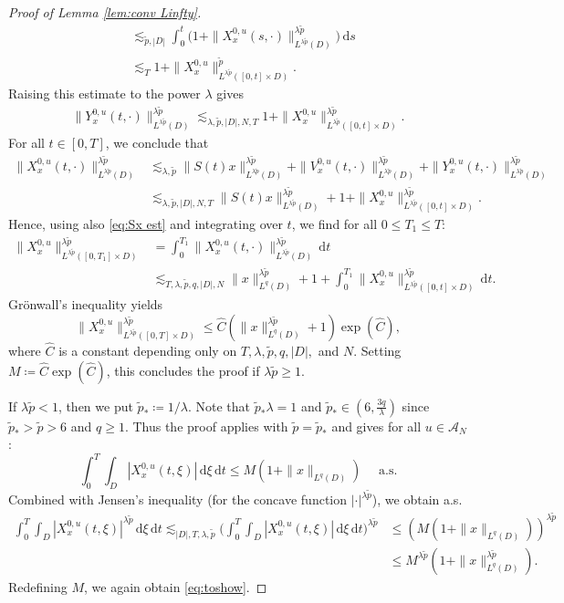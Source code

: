 \documentclass[10pt,a4paper]{amsart}
\numberwithin{equation}{section}
\newcommand{\ceqq}{\coloneqq}
\newcommand{\A}{{\mathcal A}}
\newcommand{\dd}{\,\mathrm{d}}
\begin{document}
\begin{proof}[Proof of Lemma \ref{lem:conv Linfty}]
\begin{align*}
  &\lesssim_{\tilde p,|D|} \int_0^t \big(1+\|X_x^{0,u}(s,\cdot)\|_{L^{\lambda \tilde p}(D)}^{\lambda \tilde p}\big)\dd s\\ 
  &\lesssim_T 1 + \|X_x^{0,u}\|_{L^{\lambda \tilde p}([0,t]\times D)}^{\tilde p}.
\end{align*}
Raising this estimate to the power $\lambda$ gives
\begin{align*}
  \|Y_x^{0,u}(t,\cdot)\|_{L^{\lambda\tilde p}(D)}^{\lambda\tilde p} \lesssim_{\lambda,\tilde p,|D|, N,T}   1 + \|X_x^{0,u}\|_{L^{\lambda\tilde p}([0,t]\times D)}^{\lambda\tilde p}.
\end{align*}
For all $t\in[0,T]$, we conclude that 
\begin{align*}
 \|X_x^{0,u}(t,\cdot)\|_{L^{\lambda \tilde p}(D)}^{\lambda \tilde p}
 &\lesssim_{\lambda, \tilde p} \|S(t)x\|_{L^{\lambda \tilde p}(D)}^{\lambda \tilde p}+\|V_x^{0,u}(t,\cdot)\|_{L^{\lambda \tilde p}(D)}^{\lambda \tilde p}+\|Y_x^{0,u}(t,\cdot)\|_{L^{\lambda \tilde p}(D)}^{\lambda \tilde p} \\
 &\lesssim_{\lambda,\tilde p,|D|, N,T} \|S(t)x\|_{L^{\lambda \tilde p}(D)}^{\lambda \tilde p}+ 1 + \|X_x^{0,u} \|_{L^{\lambda \tilde p}([0,t]\times D)}^{\lambda \tilde p}. 
\end{align*}
Hence, using also \eqref{eq:Sx est} and integrating over $t$,  we find  for all $0\leq  T_1\leq T$:
\begin{align*}
\|X_x^{0,u} \|_{L^{\lambda \tilde p}([0,T_1]\times D)}^{\lambda \tilde p}&= \int_0^{T_1}\|X_x^{0,u}(t,\cdot)\|_{L^{\lambda \tilde p}(D)}^{\lambda \tilde p}\dd t\\
 &\lesssim_{T,\lambda,\tilde p,q,|D|, N} \|x\|_{L^q(D)}^{\lambda \tilde p}+ 1 +\int_0^{T_1} \|X_x^{0,u} \|_{L^{\lambda \tilde p}([0,t]\times D)}^{\lambda \tilde p}\dd t.  
\end{align*} 
Gr\"onwall's inequality yields
\[
\|X_x^{0,u} \|_{L^{\lambda \tilde p}([0,T]\times D)}^{\lambda \tilde p}\leq \hat C(\|x\|_{L^q(D)}^{\lambda \tilde p}+ 1)\exp(\hat C),
\]
where $\hat C$ is a constant depending only on $T,\lambda,\tilde p,q,|D|,$ and $N$. Setting  $M\ceqq\hat C \exp(\hat C)$, this concludes the proof if $\lambda\tilde p\geq 1$.  

If $\lambda\tilde p<1$, then we put $\tilde p_*\ceqq 1/\lambda$. Note that $\tilde p_*\lambda=1$ and $\tilde p_*\in(6,\frac{3q}{\lambda})$ since $\tilde p_*>\tilde p>6$ and $q\geq 1$. Thus the proof applies with $\tilde p=\tilde p_*$ and gives for all $u\in\A_N$: 
\[
\int_0^T\int_D  |X_x^{0,u}(t,\xi)| \dd\xi\dd t \leq M(1+\|x\|_{L^q(D)})\quad \text{ a.s.}
\]
Combined with Jensen's inequality (for the concave function $|\cdot|^{\lambda \tilde p}$), we obtain a.s.
\begin{align*}
\int_0^T\int_D  |X_x^{0,u}(t,\xi)|^{\lambda \tilde p}\dd\xi\dd t\lesssim_{|D|,T,\lambda,\tilde p}
    \Big(\int_0^T\int_D  |X_x^{0,u}(t,\xi)| \dd\xi\dd t\Big)^{\lambda\tilde p} 
    &\leq (M(1+\|x\|_{L^q(D)}))^{\lambda\tilde p}\\
    &\leq M^{\lambda\tilde p}(1+\|x\|_{L^q(D)}^{\lambda \tilde p}).
\end{align*} 
Redefining $M$, we again obtain \eqref{eq:toshow}.
\end{proof}
\end{document}
